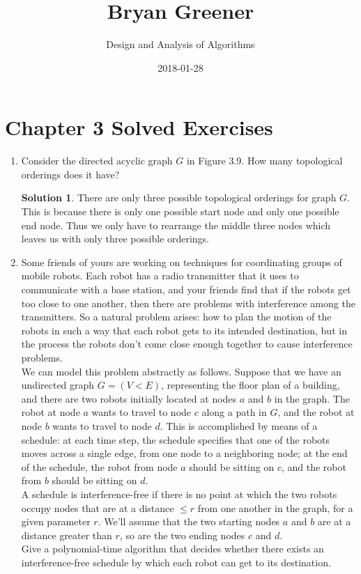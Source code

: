 \documentclass[12pt]{article}
\title{Bryan Greener}
\author{Design and Analysis of Algorithms}
\date{2018-01-28}
\theoremstyle{definition}
\newtheorem*{solution}{Solution} %
\theoremstyle{plain}
\begin{document}
\maketitle

\TabPositions{4cm}

\section{Chapter 3 Solved Exercises}
\begin{enumerate}
\item Consider the directed acyclic graph $G$ in Figure 3.9. How many topological orderings does it have?\\
\begin{solution}
There are only three possible topological orderings for graph $G$. This is because there is only one possible start node and only one possible end node. Thus we only have to rearrange the middle three nodes which leaves us with only three possible orderings.
\end{solution}

\item Some friends of yours are working on techniques for coordinating groups of mobile robots. Each robot has a radio transmitter that it uses to communicate with a base station, and your friends find that if the robots get too close to one another, then there are problems with interference among the transmitters. So a natural problem arises: how to plan the motion of the robots in such a way that each robot gets to its intended destination, but in the process the robots don't come close enough together to cause interference problems.\\
We can model this problem abstractly as follows. Suppose that we have an undirected graph $G=(V<E)$, representing the floor plan of a building, and there are two robots initially located at nodes $a$ and $b$ in the graph. The robot at node $a$ wants to travel to node $c$ along a path in $G$, and the robot at node $b$ wants to travel to node $d$. This is accomplished by means of a schedule: at each time step, the schedule specifies that one of the robots moves across a single edge, from one node to a neighboring node; at the end of the schedule, the robot from node $a$ should be sitting on $c$, and the robot from $b$ should be sitting on $d$.\\
A schedule is interference-free if there is no point at which the two robots occupy nodes that are at a distance $\leq r$ from one another in the graph, for a given parameter $r$. We'll assume that the two starting nodes $a$ and $b$ are at a  distance greater than $r$, so are the two ending nodes $c$ and $d$.\\
Give a polynomial-time algorithm that decides whether there exists an interference-free schedule by which each robot can get to its destination.
\end{enumerate}
\end{document}
